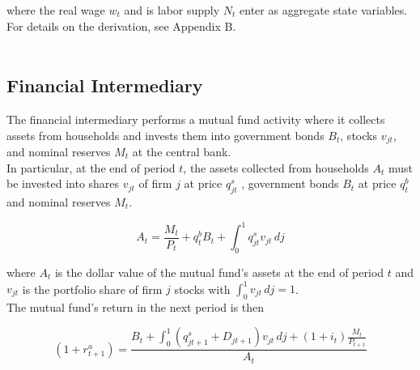 \documentclass[titlepage]{\econtex}\providecommand{\texname}{FBS-NK}
\begin{document}
where the real wage $w_{t}$  and  is labor supply $N_{t}$ enter as aggregate state variables. For details on the derivation, see Appendix B.\\ \\


\begin{comment}
Combining the transition equations, the recursive nature of
the problem allows us to rewrite it more compactly in Bellman equation form,
\begin{eqnarray*}
\VFunc_{t}(\mLevBF_{t},\pLevBF_{t}) & = & \max_{\cLevBF_{t}}~\left\{\util(\cLevBF_{t})+\DiscFac \Ex_{t}\left[ \VFunc_{t+1}((\mLevBF_{t}-\cLevBF_{t})\Rfree+ \pLevBF_{t+1}\tShkAll_{t+1},\pLevBF_{t} \PGro  \pShk_{t+1})\right]\right\}
.
\end{eqnarray*}
\end{comment} 

\hypertarget{Financial Intermediary}{}
\subsection{Financial Intermediary}

\label{subsec:Financial Intermediary}

The financial intermediary performs a mutual fund activity where it collects assets from households and invests them into government bonds $B_{t}$, stocks $v_{jt}$, and nominal reserves $M_{t}$ at the central bank.\\ 

In particular, at the end of period $t$, the assets collected from households $A_{t}$ must be invested into shares $\mathit{v}_{jt}$ of firm $j$ at price  $q^{s}_{jt}$ , government bonds $B_{t}$ at price $q^{b}_{t}$ and nominal reserves $M_{t}$. 

\begin{equation} A_{t} = \frac{M_{t}}{P_{t}} +q^{b}_{t} B_{t} + \int_{0}^{1} q^{s}_{jt}\mathit{v}_{jt}\,dj \end{equation}

where $A_{t} $ is the dollar value of the mutual fund's assets at the end of period $t$ and $ \mathit{v}_{jt}$ is the portfolio share of firm $j$ stocks with $\int_{0}^{1} \mathit{v}_{jt}\,dj =1$.  \\

The mutual fund's return in the next period is then 

$$(1+r^{a}_{t+1})  = \frac{  B_{t} + \int_{0}^{1} (q^{s}_{jt+1}+ D_{jt+1})\mathit{v}_{jt} \, dj +(1+i_{t}) \frac{M_{t}}{P_{t+1}}}{A_{t}}$$\\ 
\end{document}
